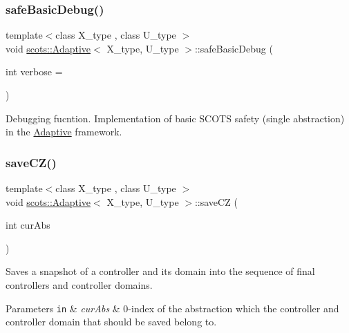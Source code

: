 \subsubsection{\texorpdfstring{safe\+Basic\+Debug()}{safeBasicDebug()}}
{\footnotesize\ttfamily template$<$class X\+\_\+type , class U\+\_\+type $>$ \\
void \hyperlink{classscots_1_1Adaptive}{scots\+::\+Adaptive}$<$ X\+\_\+type, U\+\_\+type $>$\+::safe\+Basic\+Debug (\begin{DoxyParamCaption}\item[{int}]{verbose = {} }\end{DoxyParamCaption})\hspace{0.3cm}{\ttfamily [inline]}}

Debugging fucntion. Implementation of basic S\+C\+O\+TS safety (single abstraction) in the \hyperlink{classscots_1_1Adaptive}{Adaptive} framework. \mbox{\label{classscots_1_1Adaptive_ad3b8d9cf97cd0967409c14361a40d779}} 
\subsubsection{\texorpdfstring{save\+C\+Z()}{saveCZ()}}
{\footnotesize\ttfamily template$<$class X\+\_\+type , class U\+\_\+type $>$ \\
void \hyperlink{classscots_1_1Adaptive}{scots\+::\+Adaptive}$<$ X\+\_\+type, U\+\_\+type $>$\+::save\+CZ (\begin{DoxyParamCaption}\item[{int}]{cur\+Abs }\end{DoxyParamCaption})\hspace{0.3cm}{\ttfamily [inline]}}

Saves a snapshot of a controller and its domain into the sequence of final controllers and controller domains. 
\begin{DoxyParams}[1]{Parameters}
\mbox{\tt in}  & {\em cur\+Abs} & 0-\/index of the abstraction which the controller and controller domain that should be saved belong to. \\
\hline
\end{DoxyParams}
\mbox{\label{classscots_1_1Adaptive_aed48ef46c84bf6797bea16f896e44e3a}} 
